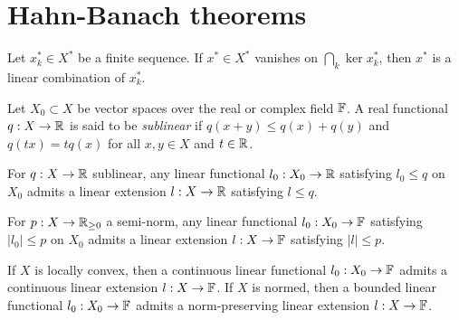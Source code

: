 \documentclass{../../large}
\begin{document}
\section{Hahn-Banach theorems}


\begin{prb}
Let $x_k^*\in X^*$ be a finite sequence.
If $x^*\in X^*$ vanishes on $\bigcap_k\ker x_k^*$, then $x^*$ is a linear combination of $x_k^*$.
\end{prb}



\begin{prb}
Let $X_0\subset X$ be vector spaces over the real or complex field $\mathbb{F}$.
A real functional $q:X\to\mathbb{R}$ is said to be \emph{sublinear} if $q(x+y)\le q(x)+q(y)$ and $q(tx)=tq(x)$ for all $x,y\in X$ and $t\in\mathbb{R}$.
\begin{parts}
\item For $q:X\to\mathbb{R}$ sublinear, any linear functional $l_0:X_0\to\mathbb{R}$ satisfying $l_0\le q$ on $X_0$ admits a linear extension $l:X\to\mathbb{R}$ satisfying $l\le q$.
\item For $p:X\to\mathbb{R}_{\ge0}$ a semi-norm, any linear functional $l_0:X_0\to\mathbb{F}$ satisfying $|l_0|\le p$ on $X_0$ admits a linear extension $l:X\to\mathbb{F}$ satisfying $|l|\le p$.
\item If $X$ is locally convex, then a continuous linear functional $l_0:X_0\to\mathbb{F}$ admits a continuous linear extension $l:X\to\mathbb{F}$.
If $X$ is normed, then a bounded linear functional $l_0:X_0\to\mathbb{F}$ admits a norm-preserving linear extension $l:X\to\mathbb{F}$.
\end{parts}
\end{prb}
\end{document}
